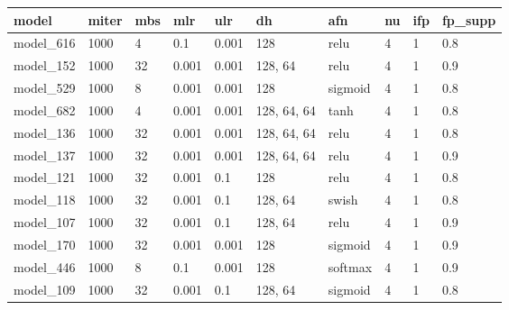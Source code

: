\begin{tabular}{|l|l|l|l|l|l|l|l|l|l|}
\hline
\textbf{model} & \textbf{miter} & \textbf{mbs} & \textbf{mlr} & \textbf{ulr} & \textbf{dh} & \textbf{afn} & \textbf{nu} & \textbf{ifp} & \textbf{fp\_supp} \\ \hline
model\_616     & 1000           & 4            & 0.1          & 0.001        & 128         & relu         & 4           & 1            & 0.8               \\ \hline
model\_152     & 1000           & 32           & 0.001        & 0.001        & 128, 64     & relu         & 4           & 1            & 0.9               \\ \hline
model\_529     & 1000           & 8            & 0.001        & 0.001        & 128         & sigmoid      & 4           & 1            & 0.8               \\ \hline
model\_682     & 1000           & 4            & 0.001        & 0.001        & 128, 64, 64 & tanh         & 4           & 1            & 0.8               \\ \hline
model\_136     & 1000           & 32           & 0.001        & 0.001        & 128, 64, 64 & relu         & 4           & 1            & 0.8               \\ \hline
model\_137     & 1000           & 32           & 0.001        & 0.001        & 128, 64, 64 & relu         & 4           & 1            & 0.9               \\ \hline
model\_121     & 1000           & 32           & 0.001        & 0.1          & 128         & relu         & 4           & 1            & 0.8               \\ \hline
model\_118     & 1000           & 32           & 0.001        & 0.1          & 128, 64     & swish        & 4           & 1            & 0.8               \\ \hline
model\_107     & 1000           & 32           & 0.001        & 0.1          & 128, 64     & relu         & 4           & 1            & 0.9               \\ \hline
model\_170     & 1000           & 32           & 0.001        & 0.001        & 128         & sigmoid      & 4           & 1            & 0.9               \\ \hline
model\_446     & 1000           & 8            & 0.1          & 0.001        & 128         & softmax      & 4           & 1            & 0.9               \\ \hline
model\_109     & 1000           & 32           & 0.001        & 0.1          & 128, 64     & sigmoid      & 4           & 1            & 0.8               \\ \hline

\end{tabular}
